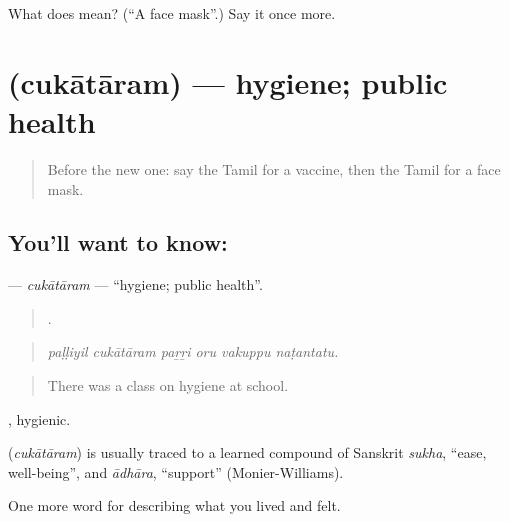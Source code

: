 \begin{tcolorbox}[breakable,colback=teal!4,colframe=teal!35!black,title={Before you move on}]
What does  mean? (\textquotedblleft{}A face mask\textquotedblright{}.) Say it once more.
\end{tcolorbox}
\section[\texorpdfstring{\ta{சுகாதாரம்} (cukātāram)}{சுகாதாரம் (cukātāram)}]{ (cukātāram) — hygiene; public health}

\label{lesson:TA-C476-cukataram}



\begin{quote}
Before the new one: say the Tamil for a vaccine, then the Tamil for a face mask.
\end{quote}

\subsection*{You'll want to know: }
\textbf{} — \emph{cukātāram} — \textquotedblleft{}hygiene; public health\textquotedblright{}.

\begin{quote}
     .
\end{quote}

\begin{quote}
\emph{paḷḷiyil cukātāram paṟṟi oru vakuppu naṭantatu.}
\end{quote}

\begin{quote}
There was a class on hygiene at school.
\end{quote}

, hygienic.

\begin{cousinweb}
\textbf{} (\emph{cukātāram}) is usually traced to a learned compound of Sanskrit \emph{sukha}, \textquotedblleft{}ease, well-being\textquotedblright{}, and \emph{ādhāra}, \textquotedblleft{}support\textquotedblright{} (Monier-Williams).
\end{cousinweb}

\begin{grammarlens}[title={What you've built}]
One more word for describing what you lived and felt.
\end{grammarlens}

